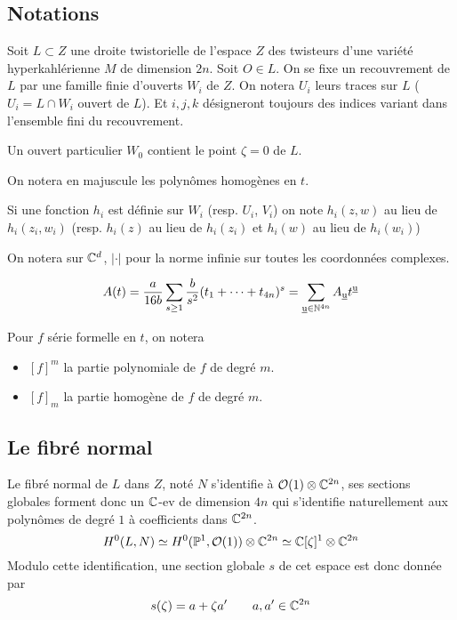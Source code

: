 \documentclass[a4paper,10pt,draft,makeidx,twocolumn]{amsart}
\DeclareMathOperator\uu{\underline{u}}
\begin{document}
\subsection{Notations}
Soit $L \subset Z$ une droite twistorielle de l'espace $Z$ des twisteurs d'une variété hyperkahlérienne $M$ de dimension $2n$. Soit $O \in L$. On se fixe un recouvrement de $L$ par une famille finie d'ouverts $W_i$ de $Z$. On notera $U_i$ leurs traces sur $L$ ($U_i = L \cap W_i$ ouvert de $L$). Et $i,j,k$ désigneront toujours des indices variant dans l'ensemble fini du recouvrement.

Un ouvert particulier $W_0$ contient le point $\zeta = 0$ de $L$.

On notera en majuscule les polynômes homogènes en $t$.

Si une fonction $h_i$ est définie sur $W_i$ (resp. $U_i$, $V_i$) on note $h_i(z,w)$ au lieu de $h_i(z_i,w_i)$ (resp. $h_i(z)$ au lieu de $h_i(z_i)$ et $h_i(w)$ au lieu de $h_i(w_i)$)

On notera sur $\mathbb{C}^d$, $\vert \cdot \vert$ pour la norme infinie sur toutes les coordonnées complexes.


\begin{equation}
A(t) = \dfrac{a}{16b}\sum_{s \geq 1} \dfrac{b}{s^2}(t_1 + \cdots + t_{4n})^s = \sum_{\uu \in \N^{4n}} A_{\uu} t^{\uu}
\end{equation}

Pour $f$ série formelle en $t$, on notera
\begin{itemize}
\item $\left[f\right]^m$ la partie polynomiale de $f$ de degré $m$.
\item $\left[f\right]_m$ la partie homogène de $f$ de degré $m$.
\end{itemize}


\subsection{Le fibré normal}
Le fibré normal de $L$ dans $Z$, noté $N$ s'identifie à $\mathcal{O}(1) \otimes \mathbb{C}^{2n}$, ses sections globales forment donc un $\mathbb{C}$-ev de dimension $4n$ qui s'identifie naturellement aux polynômes de degré $1$ à coefficients dans $\mathbb{C}^{2n}$.
\begin{equation}
H^0(L,N) \simeq H^0(\mathbb{P}^1, \mathcal{O}(1)) \otimes \mathbb{C}^{2n} \simeq \mathbb{C}[\zeta]^1 \otimes \mathbb{C}^{2n}
\end{equation}
Modulo cette identification, une section globale $s$ de cet espace est donc donnée par
\begin{equation}
s(\zeta) = a + \zeta a' \qquad  a,a' \in \mathbb{C}^{2n}
\end{equation}
\end{document}
